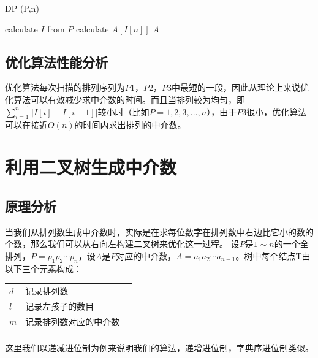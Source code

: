 \documentclass[10pt, twocolumn]{ctexart}
\begin{document}
\begin{algorithm}[!t]
\caption{DP (P,n)}
\label{get_agency_optimization}
\begin{algorithmic}[1]
\STATE calculate $I$ from $P$
\STATE calculate $A[I[n]]$
\ELSE 
{}
\ELSE
{}
\ENDIF
\ENDIF
\ENDFOR
\RETURN $A$
\end{algorithmic}
\end{algorithm}
\subsection{优化算法性能分析}
优化算法每次扫描的排列序列为$P1$，$P2$，$P3$中最短的一段，因此从理论上来说优化算法可以有效减少求中介数的时间。而且当排列较为均匀，即$\sum_{i=1}^{n-1}\left|I[i]-I[i+1]\right|$较小时（比如$P=1,2,3,...,n$），由于$P3$很小，优化算法可以在接近$O(n)$的时间内求出排列的中介数。




\section{ 利用二叉树生成中介数}
\subsection{原理分析}
当我们从排列数生成中介数时，实际是在求每位数字在排列数中右边比它小的数的个数，那么我们可以从右向左构建二叉树来优化这一过程。
设$P$是$1\sim n$的一个全排列，$P=p_1p_2\cdots p_n$，设$A$是$P$对应的中介数，$A=a_1a_2\cdots a_{n-1}$。树中每个结点T由以下三个元素构成：

\begin{tabular}{m{1cm} l m{8cm}}
\\
$d$ & 记录排列数 \\
$l$ & 记录左孩子的数目\\ 
$m$ & 记录排列数对应的中介数\\
\\
\end{tabular}

这里我们以递减进位制为例来说明我们的算法，递增进位制，字典序进位制类似。
\end{document}
